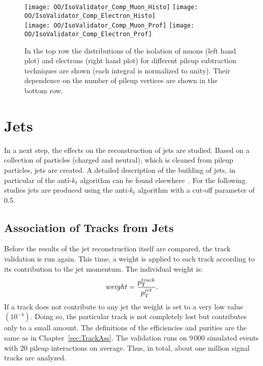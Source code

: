 \begin{figure}[Ht]
  \centering
  \texttt{[image: OO/IsoValidator\_Comp\_Muon\_Histo]}
  \texttt{[image: OO/IsoValidator\_Comp\_Electron\_Histo]}
  \\
  \texttt{[image: OO/IsoValidator\_Comp\_Muon\_Prof]}
  \texttt{[image: OO/IsoValidator\_Comp\_Electron\_Prof]}
  \caption[Distribution of the isolation of muons and electrons and their dependence on the number of pileup vertices for different pileup subtraction techniques]{In the top row the distributions of the isolation of muons (left hand plot) and electrons (right hand plot) for different pileup subtraction techniques are shown (each integral is normalized to unity). Their dependence on the number of pileup vertices are shown in the bottom row. \label{plot:OOIsoComp}}
\end{figure}

\section{Jets \label{sec:OOJets}}

In a next step, the effects on the reconstruction of jets are studied. Based on a collection of particles (charged and neutral), which is cleaned from pileup particles, jets are created. A detailed description of the building of jets, in particular of the anti-$k_{t}$ algorithm can be found elsewhere~\cite{Cacciari:2008gp}. For the following studies jets are produced using the anti-$k_{t}$ algorithm with a cut-off parameter of 0.5.

\subsection{Association of Tracks from Jets \label{sec:OOJetsTracks}}

Before the results of the jet reconstruction itself are compared, the track validation is run again. This time, a weight is applied to each track according to its contribution to the jet momentum. The individual weight is:
\begin{equation}
weight = \frac{ p_{\mathrm{T}}^{track} }{ p_{\mathrm{T}}^{jet} }.
\label{eq:OOJetWeight}
\end{equation}
If a track does not contribute to any jet the weight is set to a very low value $\left(10^{-4}\right)$. Doing so, the particular track is not completely lost but contributes only to a small amount. The definitions of the efficiencies and purities are the same as in Chapter~\ref{sec:TrackAss}. The validation runs on 9\,000 simulated \ttbar events with 20 pileup interactions on average. Thus, in total, about one million signal tracks are analyzed.

